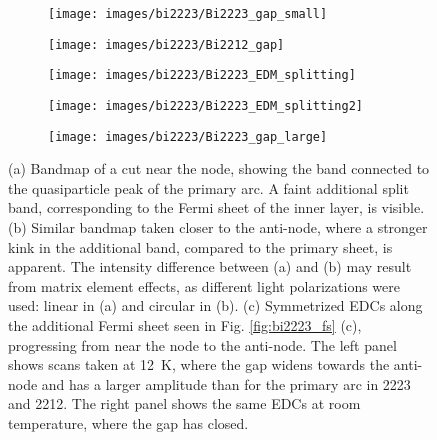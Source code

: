 \begin{figure}
	\centering
	\begin{subfigure}[b]{0.4\textwidth}
		\texttt{[image: images/bi2223/Bi2223\_gap\_small]}
		\caption{}
	\end{subfigure}
	\begin{subfigure}[b]{0.2\textwidth}
		\texttt{[image: images/bi2223/Bi2212\_gap]}
		\caption{}
	\end{subfigure}
	\caption{(a) Evolution of EDCs across the primary Fermi arc, with the positions of the EDCs corresponding to the markers in Fig. \ref{fig:bi2223_fs} (a). The left panel shows the EDCs at \qty{12}{\kelvin}. From the anti-node at (\qty{-0.55}{\per\angstrom}, \qty{0.18}{\per\angstrom}) across the arc to the opposite anti-node near (\qty{-0.2}{\per\angstrom}, \qty{0.48}{\per\angstrom}), a superconducting gap is observed, which continuously closes towards the node and reopens afterward. The right panel shows the same EDCs at room temperature (RT), where the gap has disappeared. (b) The same EDCs along the Fermi arc of 2212, where, in general, a larger gap is observed compared to the primary arc of 2223.}
	\label{fig:gap_bilayer}
	\centering
	\begin{subfigure}[b]{0.27\textwidth}
		\texttt{[image: images/bi2223/Bi2223\_EDM\_splitting]}
		\caption{}
	\end{subfigure}
	\begin{subfigure}[b]{0.3\textwidth}
		\texttt{[image: images/bi2223/Bi2223\_EDM\_splitting2]}
		\caption{}
	\end{subfigure}
	\begin{subfigure}[b]{0.39\textwidth}
		\texttt{[image: images/bi2223/Bi2223\_gap\_large]}
		\caption{}
	\end{subfigure}
	\caption{(a) Bandmap of a cut near the node, showing the band connected to the quasiparticle peak of the primary arc. A faint additional split band, corresponding to the Fermi sheet of the inner  layer, is visible. (b) Similar bandmap taken closer to the anti-node, where a stronger kink in the additional band, compared to the primary sheet, is apparent. The intensity difference between (a) and (b) may result from matrix element effects, as different light polarizations were used: linear in (a) and circular in (b). (c) Symmetrized EDCs along the additional Fermi sheet seen in Fig. \ref{fig:bi2223_fs} (c), progressing from near the node to the anti-node. The left panel shows scans taken at \qty{12}{\kelvin}, where the gap widens towards the anti-node and has a larger amplitude than for the primary arc in 2223 and 2212. The right panel shows the same EDCs at room temperature, where the gap has closed.}
	\label{fig:trilayer_splitting}
\end{figure}

